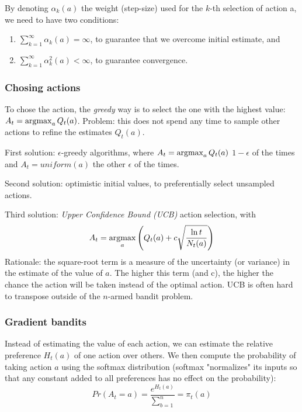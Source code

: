By denoting $\alpha_k(a)$ the weight (step-size) used for the $k$-th selection of action a, we need to have two conditions:
\begin{enumerate}
\item $\sum_{k=1}^{\infty} \alpha_k(a) = \infty$, to guarantee that we overcome initial estimate, and
\item $\sum_{k=1}^{\infty} \alpha_k^2(a) < \infty$, to guarantee convergence.
\end{enumerate}



\subsubsection{Chosing actions}
To chose the action, the \textit{greedy} way is to select the one with the highest value: $A_t = \operatorname*{argmax}_a Q_t(a)$.
Problem: this does not spend any time to sample other actions to refine the estimates $Q_t(a)$.

First solution: $\epsilon$-greedy algorithms, where $A_t = \operatorname*{argmax}_a Q_t(a)$ $1 - \epsilon$ of the times and $A_t = uniform(a)$ the other $\epsilon$ of the times.

Second solution: optimistic initial values, to preferentially select unsampled actions.

Third solution: \textit{Upper Confidence Bound (UCB)} action selection, with
\[
A_t = \operatorname*{argmax}_a \left( Q_t(a) + c \sqrt{\frac{\ln t}{N_t(a)}} \right)
\]
Rationale: the square-root term is a measure of the uncertainty (or variance) in the estimate of the value of $a$.
The higher this term (and c), the higher the chance the action will be taken instead of the optimal action.
UCB is often hard to transpose outside of the $n$-armed bandit problem.

\subsubsection{Gradient bandits}
Instead of estimating the value of each action, we can estimate the relative preference $H_t(a)$ of one action over others.
We then compute the probability of taking action $a$ using the softmax distribution (softmax "normalizes" its inputs so that any constant added to all preferences has no effect on the probability):
\[
Pr(A_t = a) = \frac{e^{H_t(a)}}{\sum_{b=1}^{n}} = \pi_t(a)
\]

